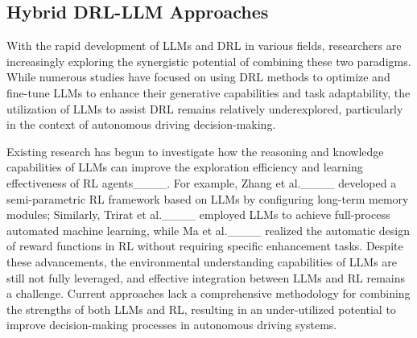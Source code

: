 \subsection{Hybrid DRL-LLM Approaches}

With the rapid development of LLMs and DRL in various fields, researchers are increasingly exploring the synergistic potential of combining these two paradigms. While numerous studies have focused on using DRL methods to optimize and fine-tune LLMs to enhance their generative capabilities and task adaptability, the utilization of LLMs to assist DRL remains relatively underexplored, particularly in the context of autonomous driving decision-making.

Existing research has begun to investigate how the reasoning and knowledge capabilities of LLMs can improve the exploration efficiency and learning effectiveness of RL agents____. For example, Zhang et al.____ developed a semi-parametric RL framework based on LLMs by configuring long-term memory modules; Similarly, Trirat et al.____ employed LLMs to achieve full-process automated machine learning, while Ma et al.____ realized the automatic design of reward functions in RL without requiring specific enhancement tasks. Despite these advancements, the environmental understanding capabilities of LLMs are still not fully leveraged, and effective integration between LLMs and RL remains a challenge. Current approaches lack a comprehensive methodology for combining the strengths of both LLMs and RL, resulting in an under-utilized potential to improve decision-making processes in autonomous driving systems.